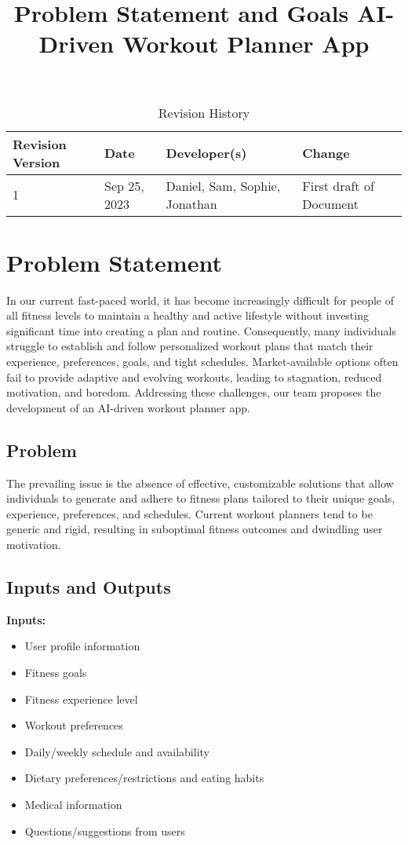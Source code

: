\documentclass{article}
\title{Problem Statement and Goals AI-Driven Workout Planner App\\\progname}
\author{\authname}  %
\date{}
\date{}
\begin{document}
    \maketitle
    \begin{table}[hp]
        \centering
        \caption{Revision History} \label{TblRevisionHistory}
        \begin{tabularx}{\textwidth}{lllX}
            \toprule
            \textbf{Revision Version} & \textbf{Date} & \textbf{Developer(s)} & \textbf{Change}\\
            \midrule
            1 & Sep 25, 2023 & Daniel, Sam, Sophie, Jonathan & First draft of Document\\
            \bottomrule
        \end{tabularx}
    \end{table}
    \section{Problem Statement}

    In our current fast-paced world, it has become increasingly difficult for people of all fitness levels to maintain a healthy and active lifestyle without investing significant time into creating a plan and routine. Consequently, many individuals struggle to establish and follow personalized workout plans that match their experience, preferences, goals, and tight schedules. Market-available options often fail to provide adaptive and evolving workouts, leading to stagnation, reduced motivation, and boredom. Addressing these challenges, our team proposes the development of an AI-driven workout planner app.

    \subsection{Problem}

    The prevailing issue is the absence of effective, customizable solutions that allow individuals to generate and adhere to fitness plans tailored to their unique goals, experience, preferences, and schedules. Current workout planners tend to be generic and rigid, resulting in suboptimal fitness outcomes and dwindling user motivation.

    \subsection{Inputs and Outputs}
    \textbf{Inputs:}
    \begin{itemize}
        \item User profile information
        \item Fitness goals
        \item Fitness experience level
        \item Workout preferences
        \item Daily/weekly schedule and availability
        \item Dietary preferences/restrictions and eating habits
        \item Medical information
        \item Questions/suggestions from users
    \end{itemize}
\end{document}
